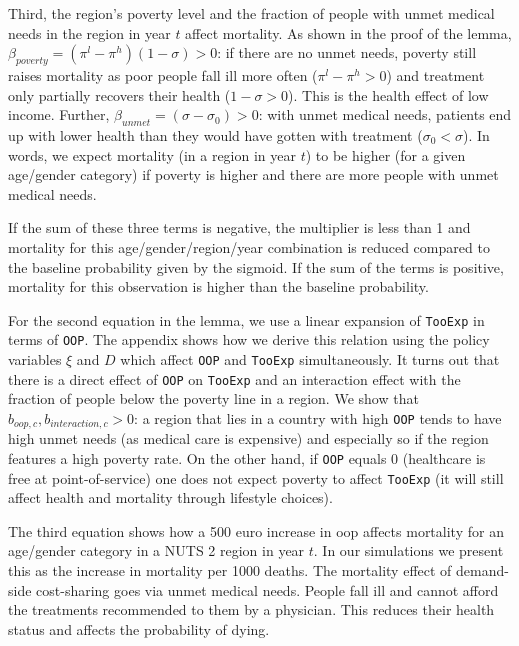 \documentclass[a4paper,12pt]{article}
\begin{document}
Third, the region's poverty level and the fraction of people with unmet medical needs in the region in year \(t\) affect mortality. As shown in the proof of the lemma, \(\beta_{poverty} = (\pi^l - \pi^h)(1-\sigma) > 0\): if there are no unmet needs, poverty still raises mortality as poor people fall ill more often (\(\pi^l-\pi^h >0\)) and treatment only partially recovers their health (\(1-\sigma>0\)). This is the health effect of low income. Further, \(\beta_{unmet}=(\sigma-\sigma_0)>0\): with unmet medical needs, patients end up with lower health than they would have gotten with treatment (\(\sigma_0 < \sigma\)). In words, we expect mortality (in a region in year \(t\)) to be higher (for a given age/gender category) if poverty is higher and there are more people with unmet medical needs.

If the sum of these three terms is negative, the multiplier is less than 1 and mortality for this age/gender/region/year combination is reduced compared to the baseline probability given by the sigmoid. If the sum of the terms is positive, mortality for this observation is higher than the baseline probability.

For the second equation in the lemma, we use a linear expansion of \texttt{TooExp} in terms of \texttt{OOP}. The appendix shows how we derive this relation using the policy variables \(\xi\) and \(D\) which affect \texttt{OOP} and \texttt{TooExp} simultaneously. It turns out that there is a direct effect of \texttt{OOP} on \texttt{TooExp} and an interaction effect with the fraction of people below the poverty line in a region. We show that \(b_{oop,c},b_{interaction,c} > 0\): a region that lies in a country with high \texttt{OOP} tends to have high unmet needs (as medical care is expensive) and especially so if the region features a high poverty rate. On the other hand, if \texttt{OOP} equals 0 (healthcare is free at point-of-service) one does not expect poverty to affect \texttt{TooExp} (it will still affect health and mortality through lifestyle choices).

The third equation shows how a 500 euro increase in oop affects mortality for an age/gender category in a NUTS 2 region in year \(t\). In our simulations we present this as the increase in mortality per 1000 deaths. The mortality effect of demand-side cost-sharing goes via unmet medical needs. People fall ill and cannot afford the treatments recommended to them by a physician. This reduces their health status and affects the probability of dying.
\end{document}
